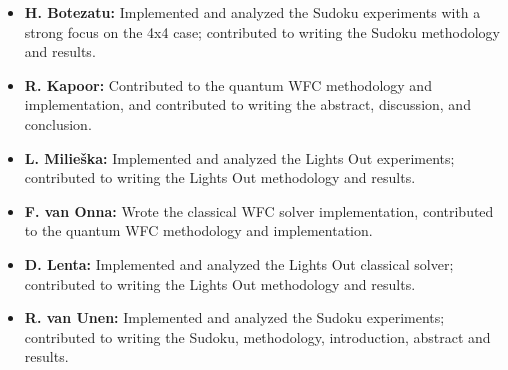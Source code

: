 \begin{itemize}
    \item \textbf{H. Botezatu:} Implemented and analyzed the Sudoku experiments with a strong focus on the 4x4 case; contributed to writing the Sudoku methodology and results.
    \item \textbf{R. Kapoor:} Contributed to the quantum WFC methodology and implementation, and contributed to writing the abstract, discussion, and conclusion.
    \item \textbf{L. Milieška:} Implemented and analyzed the Lights Out experiments; contributed to writing the Lights Out methodology and results.
    \item \textbf{F. van Onna:} Wrote the classical WFC solver implementation, contributed to the quantum WFC methodology and implementation.
    \item \textbf{D. Lenta:} Implemented and analyzed the Lights Out classical solver; contributed to writing the Lights Out methodology and results.
    \item \textbf{R. van Unen:} Implemented and analyzed the Sudoku experiments; contributed to writing the Sudoku, methodology, introduction, abstract and results.
\end{itemize}